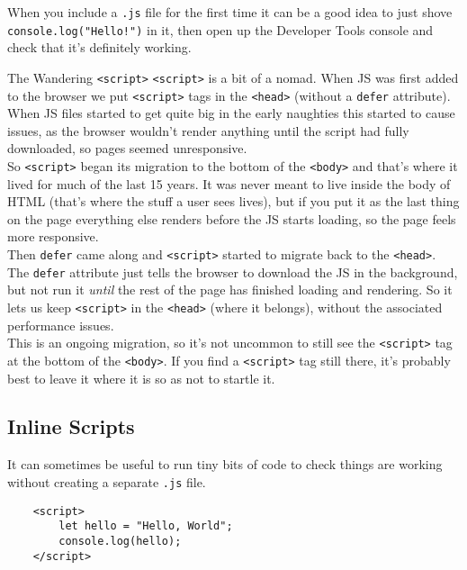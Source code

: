 When you include a \texttt{.js} file for the first time it can be a good idea to just shove \texttt{console.log("Hello!")} in it, then open up the Developer Tools console and check that it's definitely working.

\pagebreak

\begin{infobox}{The Wandering \texttt{<script>}}
    \texttt{<script>} is a bit of a nomad. When JS was first added to the browser we put \texttt{<script>} tags in the \texttt{<head>} (without a \texttt{defer} attribute). When JS files started to get quite big in the early naughties this started to cause issues, as the browser wouldn't render anything until the script had fully downloaded, so pages seemed unresponsive.
    \\

    So \texttt{<script>} began its migration to the bottom of the \texttt{<body>} and that's where it lived for much of the last 15 years. It was never meant to live inside the body of HTML (that's where the stuff a user sees lives), but if you put it as the last thing on the page everything else renders before the JS starts loading, so the page feels more responsive.
    \\

    Then \texttt{defer} came along and \texttt{<script>} started to migrate back to the \texttt{<head>}. The \texttt{defer} attribute just tells the browser to download the JS in the background, but not run it \textit{until} the rest of the page has finished loading and rendering. So it lets us keep \texttt{<script>} in the \texttt{<head>} (where it belongs), without the associated performance issues.
    \\

    This is an ongoing migration, so it's not uncommon to still see the \texttt{<script>} tag at the bottom of the \texttt{<body>}. If you find a \texttt{<script>} tag still there, it's probably best to leave it where it is so as not to startle it.
\end{infobox}

\subsection{Inline Scripts}

It can sometimes be useful to run tiny bits of code to check things are working without creating a separate \texttt{.js} file.

\begin{verbatim}
    <script>
        let hello = "Hello, World";
        console.log(hello);
    </script>
\end{verbatim}


